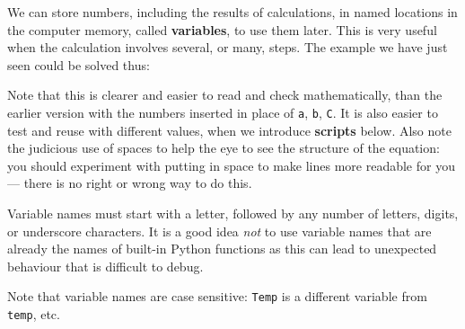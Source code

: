 We can store numbers, including the results of calculations, in named locations in the
computer memory, called \textbf{variables}, to use them later. This is very useful when
the calculation involves several, or many, steps.
The example we have just seen could be solved thus:





\noindent
Note that this is clearer and easier to read and check mathematically, than
the earlier version with the numbers inserted in place of {\tt a}, {\tt b}, {\tt C}. It is also
easier to test and reuse with different values, when we introduce \textbf{scripts} 
below. Also note the judicious use of spaces to 
help the eye to see the structure of the equation: you should experiment with 
putting in space to make lines more readable for you --- there is no right or wrong way to do this.

\vspace{6mm}
\noindent
Variable names must start with a letter, followed by any number of
letters, digits, or underscore characters. It is a good idea
\textit{not} to use variable names that are already the names of
built-in Python functions as this can lead to unexpected behaviour
that is difficult to debug.

\vspace{5mm}
\noindent
Note that variable names are case sensitive: \texttt{Temp} is a different variable from
\texttt{temp}, etc.


